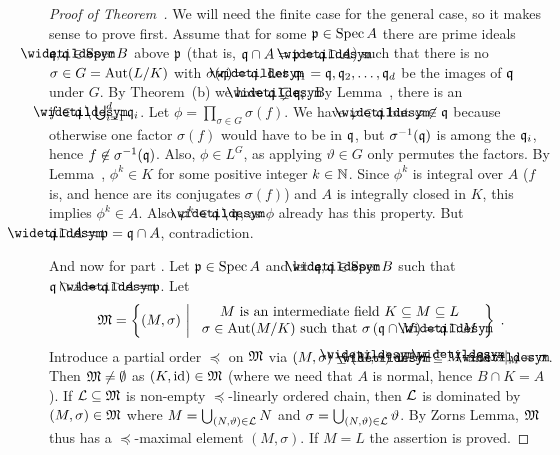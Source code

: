 \documentclass[a4paper,parskip=half,numbers=enddot, DIV=12]{scrreprt}
\begin{document}
	\begin{proof}[Proof of Theorem~]
		We will need the finite case for the general case, so it makes sense to prove  first. Assume that for some $\mathfrak{p}\in\operatorname{Spec} A$ there are prime ideals $\qq,\snake\qq\in \Spec B$ above $\mathfrak{p}$ (that is, $\qq\cap A = \pp = \snake\qq\cap A$) such that there is no $\sigma\in G =\operatorname{Aut}(L/K)$ with $\sigma(\qq) =\snake\qq$. Let $\mathfrak{q}_1=\mathfrak{q}, \mathfrak{q}_2,\ldots,\mathfrak{q}_d$ be the images of $\mathfrak{q}$ under $G$. By Theorem~(b) we have $\snake\qq\subsetneq\qq_i$. By Lemma~, there is an $f\in\snake\qq\setminus\bigcup_{i=1}^d \qq_i$. Let $\phi=\prod_{\sigma\in G}\sigma(f)$. We have $\phi\in\snake{\qq}$ but $\varphi\not\in\mathfrak{q}$ because otherwise one factor $\sigma(f)$ would have to be in $\mathfrak{q}$, but $\sigma^{-1}(\mathfrak{q})$ is among the $\mathfrak{q}_i$, hence $f\not\in\sigma^{-1}(\mathfrak{q})$. Also, $\phi\in L^G$, as applying $\vartheta\in G$ only permutes the factors. By Lemma~, $\phi^k\in K$ for some positive integer $k\in\mathbb{N}$. Since $\phi^k$ is integral over $A$ ($f$ is, and hence are its conjugates $\sigma(f)$) and $A$ is integrally closed in $K$, this implies $\phi^k\in A$. Also $\phi^k\in \snake \qq\setminus\qq$, as $\phi$ already has this property. But $\snake \qq\cap A=\pp=\qq\cap A$, contradiction.
		
		And now for part . Let $\mathfrak{p}\in\operatorname{Spec} A$ and let $\qq,\snake\qq\in \Spec B$ such that $\qq\cap A = \snake\qq\cap A = \pp$. Let 
		\begin{align*}
			\MM =\left\{(M,\sigma)\st
			\begin{array}{c}
				M\text{ is an intermediate field }K\subseteq M \subseteq L\\
				\sigma\in\Aut(M/K)\text{ such that }\sigma\left(\qq\cap M\right)  = \snake\qq \cap M
			\end{array}\right\}\;.
		\end{align*}
		Introduce a partial order $\preceq$ on $\mathfrak{M}$ via $(M,\sigma)\preceq (\snake M,\snake \sigma)$ iff $M\subseteq \snake M$ and $\snake\sigma|_M = \sigma$. Then $\mathfrak{M} \neq \emptyset$ as $(K,\operatorname{id})\in\mathfrak{M}$ (where we need that $A$ is normal, hence $B\cap K = A$). If $\mathcal{L}\subseteq\mathfrak{M}$ is non-empty $\preceq$-linearly ordered chain, then $\mathcal{L}$ is dominated by $(M,\sigma)\in\mathfrak{M}$ where $M = \bigcup_{(N,\vartheta)\in\mathcal{L}} N$ and $\sigma=\bigcup_{(N,\vartheta)\in\mathcal{L}} \vartheta$. By Zorns Lemma, $\mathfrak{M}$ thus has a $\preceq$-maximal element $(M,\sigma)$. If $M=L$ the assertion is proved. 
		

\end{proof}
\end{document}
